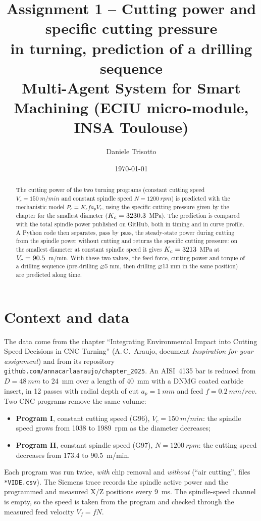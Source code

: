 \documentclass[11pt,a4paper]{article}
\title{\textbf{Assignment 1 -- Cutting power and specific cutting pressure\\
in turning, prediction of a drilling sequence}\\[4pt]
\large Multi-Agent System for Smart Machining (ECIU micro-module, INSA Toulouse)}
\author{Daniele Trisotto}
\date{\today}
\begin{document}
\maketitle

\begin{abstract}
The cutting power of the two turning programs (constant
cutting speed $V_c=\SI{150}{m/min}$ and constant spindle speed $N=\SI{1200}{rpm}$) is
predicted with the mechanistic model $P_c=K_c f a_p V_c$, using the specific cutting
pressure given by the chapter for the smallest diameter ($K_c=3230.3$~MPa). The
prediction is compared with the total spindle power published on GitHub, both in
timing and in curve profile. A Python code then separates, pass by pass, the
steady-state power during cutting from the spindle power without cutting and returns
the specific cutting pressure: on the smallest diameter at constant spindle speed it
gives $K_c=3213$~MPa at $V_c=90.5$~m/min. With these two values, the feed force,
cutting power and torque of a drilling sequence (pre-drilling $\varnothing$5 mm, then
drilling $\varnothing$13 mm in the same position) are predicted along time.
\end{abstract}

\section{Context and data}
The data come from the chapter ``Integrating Environmental Impact into Cutting Speed
Decisions in CNC Turning'' (A.\,C.~Araujo, document \emph{Inspiration for your
assignment}) and from its repository \texttt{github.com/annacarlaaraujo/chapter\_2025}.
An AISI~4135 bar is reduced from $D=\SI{48}{mm}$ to \SI{24}{mm} over a length of
\SI{40}{mm} with a DNMG coated carbide insert, in 12 passes with radial depth of cut
$a_p=\SI{1}{mm}$ and feed $f=\SI{0.2}{mm/rev}$. Two CNC programs remove the same volume:
\begin{itemize}
  \item \textbf{Program I}, constant cutting speed (G96), $V_c=\SI{150}{m/min}$: the
        spindle speed grows from 1038 to 1989~rpm as the diameter decreases;
  \item \textbf{Program II}, constant spindle speed (G97), $N=\SI{1200}{rpm}$: the
        cutting speed decreases from 173.4 to 90.5~m/min.
\end{itemize}
Each program was run twice, \emph{with} chip removal and \emph{without} (``air cutting'',
files \texttt{*VIDE.csv}). The Siemens trace records the spindle active power and the
programmed and measured X/Z positions every \SI{9}{ms}. The spindle-speed channel is
empty, so the speed is taken from the program and checked through the measured feed
velocity $V_f=fN$.
\end{document}

